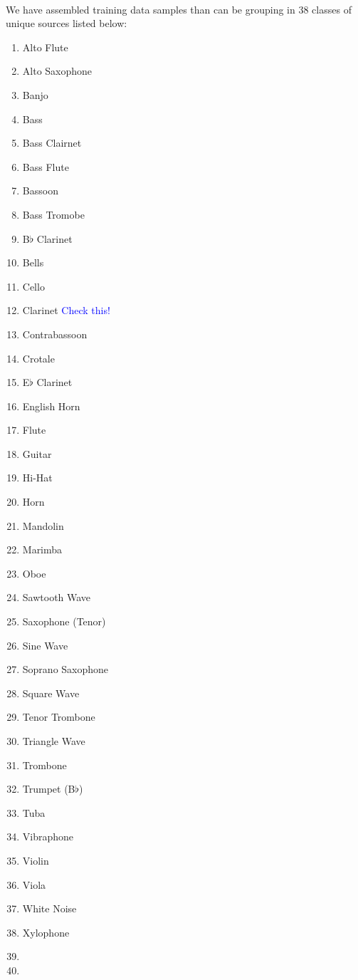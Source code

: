 \documentclass[12pt,letterpaper]{article}
\begin{document}
\paragraph*{}We have assembled training data samples than can be grouping in 38 classes of unique sources listed below:
\begin{multicols}{2}
\begin{enumerate}
	\item Alto Flute
	\item Alto Saxophone
	\item Banjo
	\item Bass
	\item Bass Clairnet
	\item Bass Flute
	\item Bassoon
	\item Bass Tromobe
	\item B$\flat$ Clarinet
	\item Bells
		
	\item Cello
	\item Clarinet \textcolor{blue}{Check this!}
	\item Contrabassoon
	\item Crotale
	\item E$\flat$ Clarinet
	\item English Horn
	\item Flute
	\item Guitar
	\item Hi-Hat
	\item Horn
		\columnbreak
	\item Mandolin
	\item Marimba
	\item Oboe
	\item Sawtooth Wave
	\item Saxophone (Tenor)
	\item Sine Wave
	\item Soprano Saxophone
	\item Square Wave
	\item Tenor Trombone
	\item Triangle Wave
		
	\item Trombone
	\item Trumpet (B$\flat$)
	\item Tuba
	\item Vibraphone
	\item Violin
	\item Viola
	\item White Noise
	\item Xylophone
	\item
	\item
\end{enumerate}
\end{multicols}
\end{document}
